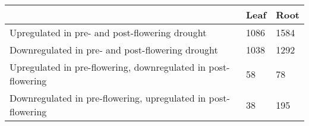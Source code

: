 \begin{tabular}{lll}
\toprule
{} & Leaf & Root \\
\midrule
Upregulated in pre- and post-flowering drought & 1086 & 1584 \\
Downregulated in pre- and post-flowering drought & 1038 & 1292 \\
Upregulated in pre-flowering, downregulated in post-flowering & 58 & 78 \\
Downregulated in pre-flowering, upregulated in post-flowering & 38 & 195 \\
\bottomrule
\end{tabular}
